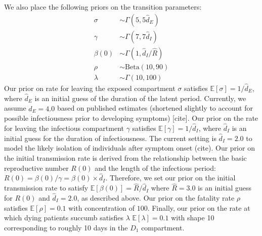 \documentclass[11pt]{amsart}
\newcommand{\Beta}{\text{Beta}}
\newcommand{\E}{\mathbb{E}}
\begin{document}
We also place the following priors on the transition parameters: 
\begin{align*}
\sigma &\sim \Gamma(5, 5 \hat{d}_E)\\
\gamma & \sim \Gamma(7, 7 \hat{d}_I) \\
\beta(0) &\sim \Gamma(1, \hat{d}_I/\hat{R}) \\
    \rho &\sim \Beta(10, 90)\\ 
\lambda &\sim \Gamma(10, 100)
\end{align*}
 Our prior on rate for leaving the exposed compartment $\sigma$ satisfies $\E[\sigma] = 1/\hat{d}_E$, where $\hat{d}_E$ is an initial guess of the duration of the latent period. Currently, we assume $\hat{d}_E = 4.0$ based on published estimates (shortened slightly to account for possible infectiousness prior to developing symptoms) [cite].
 Our prior on the rate for leaving the infectious compartment $\gamma$ satisfies $\E[\gamma] = 1/\hat{d}_I$, where $\hat{d}_I$ is an initial guess for the duration of infectiousness. The current setting is $\hat{d}_I = 2.0$ to model the likely isolation of individuals after symptom onset (cite). 
Our prior on the initial transmission rate is derived from the relationship between the basic reproductive number $R(0)$ and the length of the infectious period: $R(0) = \beta(0)/\gamma = \beta(0)\times \hat{d}_I$. Therefore, we set our prior on the initial transmission rate to satisfy $\E[\beta(0)] = \hat{R}/\hat{d}_I$ where $\hat{R} = 3.0$ is an initial guess for $R(0)$ and $\hat{d}_I = 2.0$, as described above. 
Our prior on the fatality rate $\rho$ satisfies $\E[\rho] = 0.1$ with concentration of $100$.
Finally, our prior on the rate at which dying patients succumb  satisfies $\lambda$ $\E[\lambda] = 0.1$ with shape 10 corresponding to roughly 10 days in the $D_{1}$ compartment.
\end{document}

